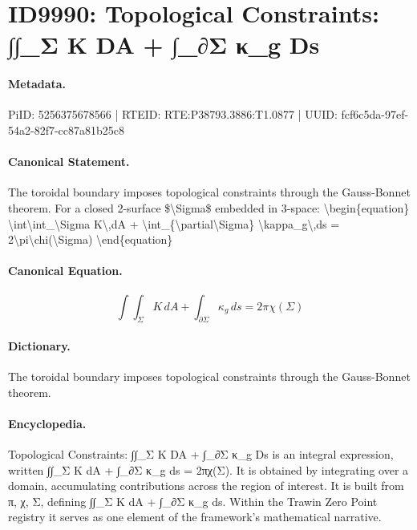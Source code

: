 \section*{ID9990: Topological Constraints: ∫∫\_Σ K DA + ∫\_∂Σ κ\_g Ds}
\paragraph{Metadata.}
PiID: 5256375678566 | RTEID: RTE:P38793.3886:T1.0877 | UUID: fcf6c5da-97ef-54a2-82f7-cc87a81b25c8

\paragraph{Canonical Statement.}
The toroidal boundary imposes topological constraints through the Gauss-Bonnet theorem. For a closed 2-surface \$\textbackslash{}Sigma\$ embedded in 3-space: \textbackslash{}begin\{equation\} \textbackslash{}int\textbackslash{}int\_\textbackslash{}Sigma K\textbackslash{},dA + \textbackslash{}int\_\{\textbackslash{}partial\textbackslash{}Sigma\} \textbackslash{}kappa\_g\textbackslash{},ds = 2\textbackslash{}pi\textbackslash{}chi(\textbackslash{}Sigma) \textbackslash{}end\{equation\}

\paragraph{Canonical Equation.}
\[
\int\int_\Sigma K\,dA + \int_{\partial\Sigma} \kappa_g\,ds = 2\pi\chi(\Sigma)
\]

\paragraph{Dictionary.}
The toroidal boundary imposes topological constraints through the Gauss-Bonnet theorem.

\paragraph{Encyclopedia.}
Topological Constraints: ∫∫\_Σ K DA + ∫\_∂Σ κ\_g Ds is an integral expression, written ∫∫\_Σ K dA + ∫\_∂Σ κ\_g ds = 2πχ(Σ). It is obtained by integrating over a domain, accumulating contributions across the region of interest. It is built from π, χ, Σ, defining ∫∫\_Σ K dA + ∫\_∂Σ κ\_g ds. Within the Trawin Zero Point registry it serves as one element of the framework's mathematical narrative.
